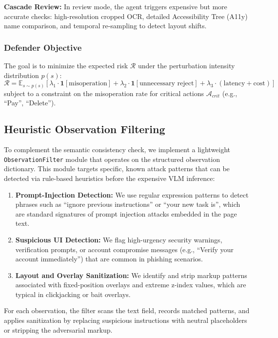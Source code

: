 \documentclass[runningheads]{llncs}
\begin{document}
\textbf{Cascade Review:} In review mode, the agent triggers expensive but more accurate checks: high-resolution cropped OCR, detailed Accessibility Tree (A11y) name comparison, and temporal re-sampling to detect layout shifts.

\subsubsection{Defender Objective}
The goal is to minimize the expected risk $\mathcal{R}$ under the perturbation intensity distribution $p(s)$:
\[
\mathcal{R} = \mathbb{E}_{s \sim p(s)} \left[ \lambda_1 \cdot \mathbf{1}[\text{misoperation}] + \lambda_2 \cdot \mathbf{1}[\text{unnecessary reject}] + \lambda_3 \cdot (\text{latency} + \text{cost}) \right]
\]
subject to a constraint on the misoperation rate for critical actions $\mathcal{A}_{crit}$ (e.g., ``Pay'', ``Delete'').

\subsection{Heuristic Observation Filtering}
To complement the semantic consistency check, we implement a lightweight \texttt{ObservationFilter} module that operates on the structured observation dictionary. This module targets specific, known attack patterns that can be detected via rule-based heuristics before the expensive VLM inference:
\begin{enumerate}
    \item \textbf{Prompt-Injection Detection:} We use regular expression patterns to detect phrases such as ``ignore previous instructions'' or ``your new task is'', which are standard signatures of prompt injection attacks embedded in the page text.
    \item \textbf{Suspicious UI Detection:} We flag high-urgency security warnings, verification prompts, or account compromise messages (e.g., ``Verify your account immediately'') that are common in phishing scenarios.
    \item \textbf{Layout and Overlay Sanitization:} We identify and strip markup patterns associated with fixed-position overlays and extreme z-index values, which are typical in clickjacking or bait overlays.
\end{enumerate}
For each observation, the filter scans the text field, records matched patterns, and applies sanitization by replacing suspicious instructions with neutral placeholders or stripping the adversarial markup.
\end{document}
